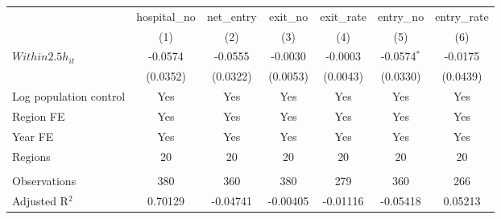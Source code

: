 \begingroup
\centering
\begin{tabular}{lcccccc}
   \toprule
                          & hospital\_no  & net\_entry  & exit\_no  & exit\_rate  & entry\_no     & entry\_rate \\    
                          & (1)           & (2)         & (3)       & (4)         & (5)           & (6)\\  
   \midrule 
   $Within2.5h_{it}$      & -0.0574       & -0.0555     & -0.0030   & -0.0003     & -0.0574$^{*}$ & -0.0175\\   
                          & (0.0352)      & (0.0322)    & (0.0053)  & (0.0043)    & (0.0330)      & (0.0439)\\   
   Log population control & Yes           & Yes         & Yes       & Yes         & Yes           & Yes\\  
   Region FE              & Yes           & Yes         & Yes       & Yes         & Yes           & Yes\\  
   Year FE                & Yes           & Yes         & Yes       & Yes         & Yes           & Yes\\  
   Regions                & 20            & 20          & 20        & 20          & 20            & 20\\  
    \\
   Observations           & 380           & 360         & 380       & 279         & 360           & 266\\  
   Adjusted R$^2$         & 0.70129       & -0.04741    & -0.00405  & -0.01116    & -0.05418      & 0.05213\\  
   \bottomrule
\end{tabular}
\par\endgroup
